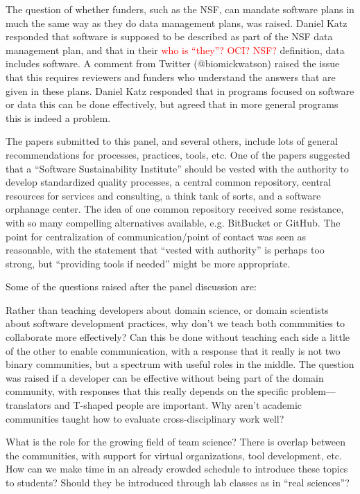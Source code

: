 \documentclass[11pt, oneside]{amsart}
\newcommand{\note}[1]{ {\textcolor{red}    { #1 }}}
\begin{document}
The question of whether funders, such as the NSF, can mandate software plans in
much the same way as they do data management plans, was raised. Daniel Katz responded that
software is supposed to be described as part of the NSF data management plan,
and that in their \note{who is ``they''? OCI? NSF?} definition, data includes software. A comment from Twitter
(@biomickwatson) raised the issue that this requires reviewers and funders who
understand the answers that are given in these plans. Daniel Katz responded
that in programs focused on software or data this can be done effectively, but
agreed that in more general programs this is indeed a problem.

The papers submitted to this panel, and several others, include lots of general
recommendations for processes, practices, tools, etc. One of the papers
suggested that a ``Software Sustainability Institute'' should be vested with
the authority to develop standardized quality processes, a central common
repository, central resources for services and consulting, a think tank of
sorts, and a software orphanage center. The idea of one common repository received
some resistance, with so many compelling alternatives available, e.g. BitBucket or
GitHub. The point for centralization of communication/point of contact was seen as
reasonable, with the statement that ``vested with authority'' is perhaps too strong,
but ``providing tools if needed'' might be more appropriate.

Some of the questions raised after the panel discussion are:

Rather than teaching developers about domain science, or domain scientists about
software development practices, why don't we teach both communities to
collaborate more effectively? Can this be done without teaching each side a
little of the other to enable communication, with a response that it really is
not two binary communities, but a spectrum with useful roles in the middle.
The question was raised if a developer can be effective without being part of the
domain community, with responses that this really depends on the specific
problem---translators and T-shaped people are important. Why aren't academic
communities taught how to evaluate cross-disciplinary work well?

What is the role for the growing field of team science? There
is overlap between the communities, with support for virtual organizations,
tool development, etc. How can we make time in an already crowded schedule to
introduce these topics to students? Should they be introduced through lab
classes as in ``real sciences''?
\end{document}
